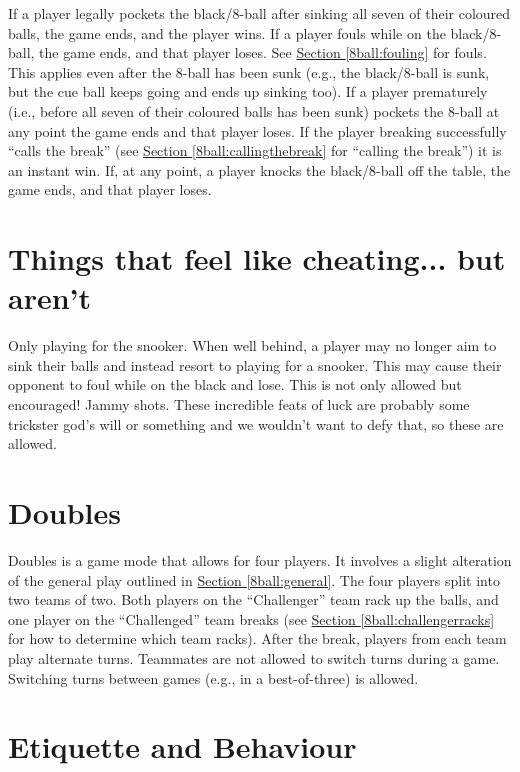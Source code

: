  If a player legally pockets the black/8-ball after sinking all seven of their coloured balls, the game ends, and the player wins.%
 If a player fouls while on the black/8-ball, the game ends, and that player loses. See \hyperref[8ball:fouling]{Section \ref*{8ball:fouling}} for fouls. This applies even after the 8-ball has been sunk (e.g., the black/8-ball is sunk, but the cue ball keeps going and ends up sinking too).%
 If a player prematurely (i.e., before all seven of their coloured balls has been sunk) pockets the 8-ball at any point the game ends and that player loses.%
 If the player breaking successfully “calls the break” (see \hyperref[8ball:callingthebreak]{Section \ref*{8ball:callingthebreak}} for “calling the break”) it is an instant win.%
 If, at any point, a player knocks the black/8-ball off the table, the game ends, and that player loses.%
 \IntentionalFoulLoss[8ball]%
 \MisleadingOpponentLoss[8ball]%
 \PoorBehaviorLoss[8ball]%

\section{Things that feel like cheating... but aren't} \label{8ball:notcheating}

 Only playing for the snooker. When well behind, a player may no longer aim to sink their balls and instead resort to playing for a snooker. This may cause their opponent to foul while on the black and lose. This is not only allowed but encouraged!%
 Jammy shots. These incredible feats of luck are probably some trickster god's will or something and we wouldn't want to defy that, so these are allowed.%

\section{Doubles} \label{8ball:doubles}

 Doubles is a game mode that allows for four players. It involves a slight alteration of the general play outlined in \hyperref[8ball:general]{Section \ref*{8ball:general}}.%
 The four players split into two teams of two.%
 Both players on the “Challenger” team rack up the balls, and one player on the “Challenged” team breaks (see \hyperref[8ball:challengerracks]{Section \ref*{8ball:challengerracks}} for how to determine which team racks).%
 After the break, players from each team play alternate turns.%
 Teammates are not allowed to switch turns during a game. Switching turns between games (e.g., in a best-of-three) is allowed.%

\section{Etiquette and Behaviour} \label{8ball:etiquette}

\label{8ball:misleading}\Misleading%
 \DistractingWhileSettingUp%
 \DistractingWhileStriking%
\label{8ball:sportsmanship}\Sportsmanship%
